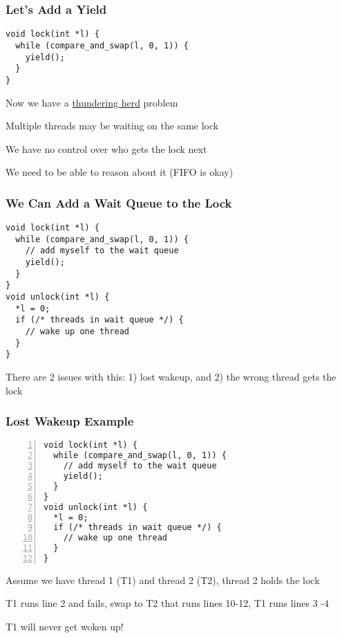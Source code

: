   \begin{frame}[fragile]
    \frametitle{Let's Add a Yield}

    \begin{lstlisting}
void lock(int *l) {
  while (compare_and_swap(l, 0, 1)) {
    yield();
  }
}
    \end{lstlisting}

    \vspace{2em}

    Now we have a 
    \href{https://en.wikipedia.org/wiki/Thundering_herd_problem}{thundering herd}
    problem

    \hspace{2em} Multiple threads may be waiting on the same lock

    \vspace{2em}

    We have no control over who gets the lock next

    \hspace{2em} We need to be able to reason about it (FIFO is okay)
  \end{frame}

  \begin{frame}[fragile]
    \frametitle{We Can Add a Wait Queue to the Lock}

    \begin{lstlisting}
void lock(int *l) {
  while (compare_and_swap(l, 0, 1)) {
    // add myself to the wait queue
    yield();
  }
}
void unlock(int *l) {
  *l = 0;
  if (/* threads in wait queue */) {
    // wake up one thread
  }
}
    \end{lstlisting}

    There are 2 issues with this: 1) lost wakeup, and 2) the wrong thread gets
    the lock
  \end{frame}

  \begin{frame}[fragile]
    \frametitle{Lost Wakeup Example}

    \begin{lstlisting}[numbers=left]
void lock(int *l) {
  while (compare_and_swap(l, 0, 1)) {
    // add myself to the wait queue
    yield();
  }
}
void unlock(int *l) {
  *l = 0;
  if (/* threads in wait queue */) {
    // wake up one thread
  }
}
    \end{lstlisting}

    Assume we have thread 1 (T1) and thread 2 (T2), thread 2 holds the lock

    \hspace{2em} T1 runs line 2 and fails, swap to T2 that runs lines 10-12, T1
    runs lines 3 -4

    \hspace{4em} T1 will never get woken up!
  \end{frame}

